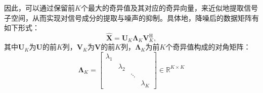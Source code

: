 因此，可以通过保留前\( K \)个最大的奇异值及其对应的奇异向量，来近似地提取信号子空间，从而实现对信号成分的提取与噪声的抑制。具体地，降噪后的数据矩阵有如下形式：
\[
    \hat{\mathbf{X}} = \mathbf{U}_K \mathbf{\Lambda}_K \mathbf{V}_K^{\mathrm{H}},
\]
其中\( \mathbf{U}_K \)为\( \mathbf{U} \)的前\( K \)列，\( \mathbf{V}_K \)为\( \mathbf{V} \)的前\( K \)列，\( \mathbf{\Lambda}_K \)为前\( K \)个奇异值构成的对角矩阵：
\[
    \mathbf{\Lambda}_K = \begin{bmatrix}
        \lambda_1 &           &        &           \\
                  & \lambda_2 &        &           \\
                  &           & \ddots &           \\
                  &           &        & \lambda_K
    \end{bmatrix} \in \mathbb{R}^{K \times K}
\]

